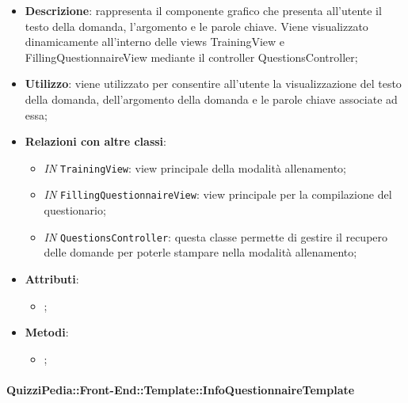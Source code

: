 		\begin{itemize}
			\item \textbf{Descrizione}: rappresenta il componente grafico che presenta all'utente il testo della domanda, l'argomento e le parole chiave. Viene visualizzato dinamicamente all'interno delle views TrainingView e FillingQuestionnaireView mediante il controller QuestionsController;
			\item \textbf{Utilizzo}: viene utilizzato per consentire all'utente la visualizzazione del testo della domanda, dell'argomento della domanda e le parole chiave associate ad essa;
			\item \textbf{Relazioni con altre classi}: 
			\begin{itemize}
				\item \textit{IN} \texttt{TrainingView}: view principale della modalità allenamento; 
				\item \textit{IN} \texttt{FillingQuestionnaireView}: view principale per la compilazione del questionario;
				\item \textit{IN} \texttt{QuestionsController}: questa classe permette di gestire il recupero delle domande per poterle stampare nella modalità allenamento;
			\end{itemize}
			\item \textbf{Attributi}: 
			\begin{itemize}
				\item ;
			\end{itemize}
			\item \textbf{Metodi}: 
			\begin{itemize}
				\item ;
			\end{itemize}
		\end{itemize}
		
		\paragraph{QuizziPedia::Front-End::Template::InfoQuestionnaireTemplate}
		
		\label{QuizziPedia::Front-End::Templates::InfoQuestionnaireTemplate}
		
